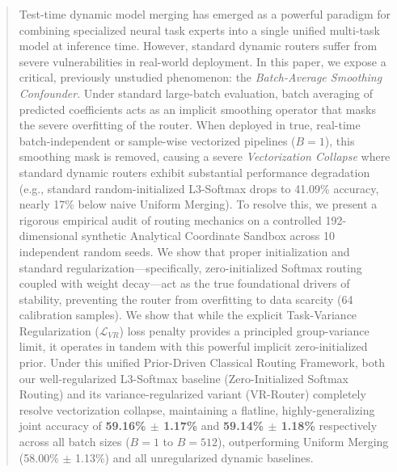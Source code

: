 \begin{abstract}
Test-time dynamic model merging has emerged as a powerful paradigm for combining specialized neural task experts into a single unified multi-task model at inference time.
However, standard dynamic routers suffer from severe vulnerabilities in real-world deployment. In this paper, we expose a critical, previously unstudied phenomenon: the \emph{Batch-Average Smoothing Confounder}. Under standard large-batch evaluation, batch averaging of predicted coefficients acts as an implicit smoothing operator that masks the severe overfitting of the router. When deployed in true, real-time batch-independent or sample-wise vectorized pipelines ($B=1$), this smoothing mask is removed, causing a severe \emph{Vectorization Collapse} where standard dynamic routers exhibit substantial performance degradation (e.g., standard random-initialized L3-Softmax drops to 41.09\% accuracy, nearly 17\% below naive Uniform Merging).
To resolve this, we present a rigorous empirical audit of routing mechanics on a controlled 192-dimensional synthetic Analytical Coordinate Sandbox across 10 independent random seeds. We show that proper initialization and standard regularization---specifically, zero-initialized Softmax routing coupled with weight decay---act as the true foundational drivers of stability, preventing the router from overfitting to data scarcity (64 calibration samples). We show that while the explicit Task-Variance Regularization ($\mathcal{L}_{VR}$) loss penalty provides a principled group-variance limit, it operates in tandem with this powerful implicit zero-initialized prior. Under this unified Prior-Driven Classical Routing Framework, both our well-regularized L3-Softmax baseline (Zero-Initialized Softmax Routing) and its variance-regularized variant (VR-Router) completely resolve vectorization collapse, maintaining a flatline, highly-generalizing joint accuracy of \textbf{59.16\% $\pm$ 1.17\%} and \textbf{59.14\% $\pm$ 1.18\%} respectively across all batch sizes ($B=1$ to $B=512$), outperforming Uniform Merging (58.00\% $\pm$ 1.13\%) and all unregularized dynamic baselines.
\end{abstract}
